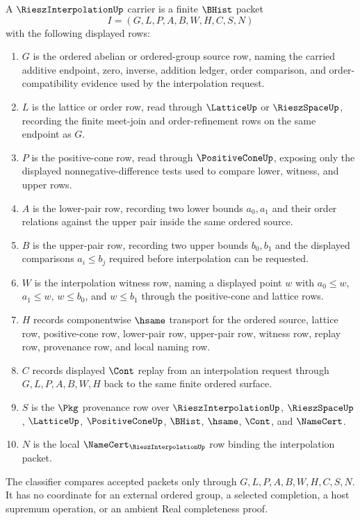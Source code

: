 \begin{definition}
\label{def:riesz-interpolation-carrier}
A $\RieszInterpolationUp$ carrier is a finite $\BHist$ packet
$$
I=(G,L,P,A,B,W,H,C,S,N)
$$
with the following displayed rows:
\begin{enumerate}
\item $G$ is the ordered abelian or ordered-group source row, naming the carried additive endpoint, zero, inverse, addition ledger, order comparison, and order-compatibility evidence used by the interpolation request.
\item $L$ is the lattice or order row, read through $\LatticeUp$ or $\RieszSpaceUp$, recording the finite meet-join and order-refinement rows on the same endpoint as $G$.
\item $P$ is the positive-cone row, read through $\PositiveConeUp$, exposing only the displayed nonnegative-difference tests used to compare lower, witness, and upper rows.
\item $A$ is the lower-pair row, recording two lower bounds $a_{0},a_{1}$ and their order relations against the upper pair inside the same ordered source.
\item $B$ is the upper-pair row, recording two upper bounds $b_{0},b_{1}$ and the displayed comparisons $a_{i}\leq b_{j}$ required before interpolation can be requested.
\item $W$ is the interpolation witness row, naming a displayed point $w$ with $a_{0}\leq w$, $a_{1}\leq w$, $w\leq b_{0}$, and $w\leq b_{1}$ through the positive-cone and lattice rows.
\item $H$ records componentwise $\hsame$ transport for the ordered source, lattice row, positive-cone row, lower-pair row, upper-pair row, witness row, replay row, provenance row, and local naming row.
\item $C$ records displayed $\Cont$ replay from an interpolation request through $G,L,P,A,B,W,H$ back to the same finite ordered surface.
\item $S$ is the $\Pkg$ provenance row over $\RieszInterpolationUp$, $\RieszSpaceUp$, $\LatticeUp$, $\PositiveConeUp$, $\BHist$, $\hsame$, $\Cont$, and $\NameCert$.
\item $N$ is the local $\NameCert_{\RieszInterpolationUp}$ row binding the interpolation packet.
\end{enumerate}
The classifier compares accepted packets only through $G,L,P,A,B,W,H,C,S,N$. It has no coordinate for an external ordered group, a selected completion, a host supremum operation, or an ambient Real completeness proof.
\end{definition}

